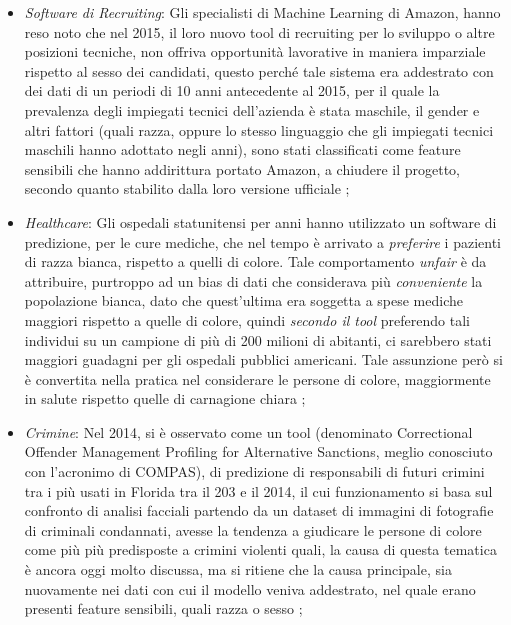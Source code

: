 \begin{itemize}
    \item \emph{Software di Recruiting}: Gli specialisti di Machine Learning di Amazon, hanno reso noto che nel 2015, il loro nuovo tool di recruiting per lo sviluppo o altre posizioni tecniche, non offriva opportunità lavorative in maniera imparziale rispetto al sesso dei candidati, questo perché tale sistema era addestrato con dei dati di un periodi di 10 anni antecedente al 2015, per il quale la prevalenza degli impiegati tecnici dell'azienda è stata maschile, il gender e altri fattori (quali razza, oppure lo stesso linguaggio che gli impiegati tecnici maschili hanno adottato negli anni), sono stati classificati come feature sensibili che hanno addirittura portato Amazon, a chiudere il progetto, secondo quanto stabilito dalla loro versione ufficiale \cite{amazonrecruiting2018reuters};
    
    
    \item \emph{Healthcare}: Gli ospedali statunitensi per anni hanno utilizzato un software di predizione, per le cure mediche, che nel tempo è arrivato a \emph{preferire} i pazienti di razza bianca, rispetto a quelli di colore. Tale comportamento \emph{unfair} è da attribuire, purtroppo ad un bias di dati che considerava più \emph{conveniente} la popolazione bianca, dato che quest'ultima era soggetta a spese mediche maggiori rispetto a quelle di colore, quindi \emph{secondo il tool} preferendo tali individui su un campione di più di 200 milioni di abitanti, ci sarebbero stati maggiori guadagni per gli ospedali pubblici americani. Tale assunzione però si è convertita nella pratica nel considerare le persone di colore, maggiormente in salute rispetto quelle di carnagione chiara \cite{HealtCareBias};
    
    \item \emph{Crimine}: Nel 2014, si è osservato come un tool (denominato Correctional Offender Management Profiling for Alternative Sanctions, meglio conosciuto con l'acronimo di COMPAS), di predizione di responsabili di futuri crimini tra i più usati in Florida tra il 203 e il 2014, il cui funzionamento si basa sul confronto di analisi facciali partendo da  un dataset di immagini di fotografie di criminali condannati, avesse la tendenza a giudicare le persone di colore come più più predisposte a crimini violenti quali, la causa di questa tematica è ancora oggi molto discussa, ma si ritiene che la causa principale, sia nuovamente nei dati con cui il modello veniva addestrato, nel quale erano presenti feature sensibili, quali razza o sesso \cite{biasblack2016propublica};
    

\end{itemize}
